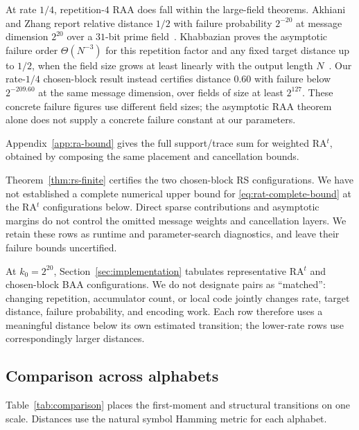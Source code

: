 \documentclass[runningheads,envcountsame,envcountsect]{llncs}
\begin{document}
At rate $1/4$, repetition-$4$ RAA does fall within the large-field theorems.
Akhiani and Zhang report relative distance $1/2$ with failure probability
$2^{-20}$ at message dimension $2^{20}$ over a $31$-bit prime
field~\cite{akhiani26}.  Khabbazian proves the asymptotic failure order
$\Theta(N^{-3})$ for this repetition factor and any fixed target distance
up to $1/2$, when the field size grows at least linearly with the output
length $N$~\cite{khabbazian26}.  Our rate-$1/4$ chosen-block result instead
certifies distance $0.60$ with failure below $2^{-209.60}$ at the same message
dimension, over fields of size at least $2^{127}$.  These concrete failure
figures use different field sizes; the asymptotic RAA theorem alone does
not supply a concrete failure constant at our parameters.

Appendix~\ref{app:ra-bound} gives the full support/trace sum for weighted
RA$^t$, obtained by composing the same placement and cancellation bounds.

Theorem~\ref{thm:rs-finite} certifies the two chosen-block RS configurations.
We have not established a complete numerical upper bound for
\eqref{eq:rat-complete-bound} at the RA$^t$ configurations below.  Direct sparse
contributions and asymptotic margins do not control the omitted message
weights and cancellation layers.  We retain these rows as runtime and
parameter-search diagnostics, and leave their failure bounds uncertified.

At $k_0=2^{20}$, Section~\ref{sec:implementation} tabulates representative
RA$^t$ and chosen-block BAA configurations.  We do not designate pairs as
``matched'': changing repetition, accumulator count, or local code jointly
changes rate, target distance, failure probability, and encoding work.  Each
row therefore uses a meaningful distance below its own estimated transition;
the lower-rate rows use correspondingly larger distances.

\subsection{Comparison across alphabets}
\label{sec:comparison}

Table~\ref{tab:comparison} places the first-moment and structural transitions
on one scale.  Distances use the natural symbol Hamming metric for each
alphabet.
\end{document}
